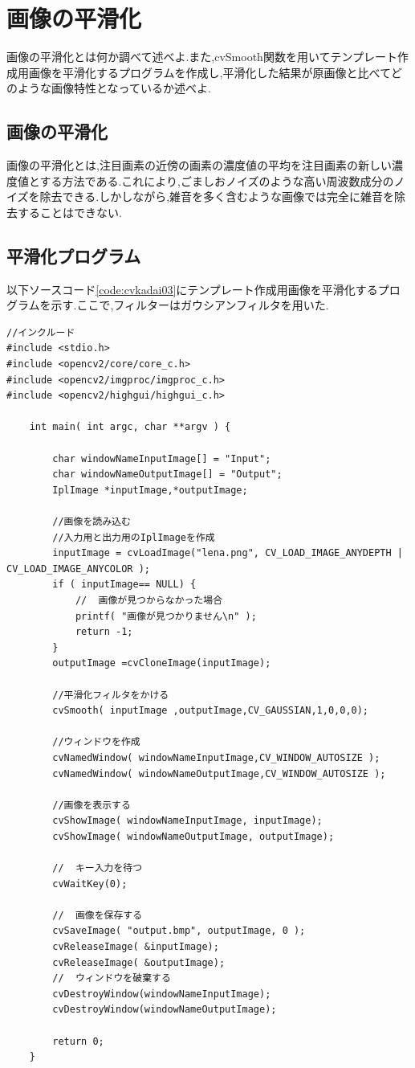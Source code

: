 \documentclass{jarticle}
\begin{document}
\section{画像の平滑化}
画像の平滑化とは何か調べて述べよ.また,cvSmooth関数を用いてテンプレート作成用画像を平滑化するプログラムを作成し,平滑化した結果が原画像と比べてどのような画像特性となっているか述べよ.

\subsection{画像の平滑化}
画像の平滑化とは,注目画素の近傍の画素の濃度値の平均を注目画素の新しい濃度値とする方法である.これにより,ごましおノイズのような高い周波数成分のノイズを除去できる.しかしながら,雑音を多く含むような画像では完全に雑音を除去することはできない.
\subsection{平滑化プログラム}
以下ソースコード\ref{code:cvkadai03}にテンプレート作成用画像を平滑化するプログラムを示す.ここで,フィルターはガウシアンフィルタを用いた.
\begin{lstlisting}[caption = 動画に対するテンプレートマッチング,label=code:cvkadai03]
	//インクルード
#include <stdio.h>
#include <opencv2/core/core_c.h>
#include <opencv2/imgproc/imgproc_c.h>
#include <opencv2/highgui/highgui_c.h>

	int main( int argc, char **argv ) {

		char windowNameInputImage[] = "Input";
		char windowNameOutputImage[] = "Output";
		IplImage *inputImage,*outputImage;

		//画像を読み込む
		//入力用と出力用のIplImageを作成
		inputImage = cvLoadImage("lena.png", CV_LOAD_IMAGE_ANYDEPTH | CV_LOAD_IMAGE_ANYCOLOR );
		if ( inputImage== NULL) {
			//	画像が見つからなかった場合
			printf( "画像が見つかりません\n" );
			return -1;
		}
		outputImage =cvCloneImage(inputImage);

		//平滑化フィルタをかける 
		cvSmooth( inputImage ,outputImage,CV_GAUSSIAN,1,0,0,0);

		//ウィンドウを作成
		cvNamedWindow( windowNameInputImage,CV_WINDOW_AUTOSIZE );
		cvNamedWindow( windowNameOutputImage,CV_WINDOW_AUTOSIZE );

		//画像を表示する
		cvShowImage( windowNameInputImage, inputImage);
		cvShowImage( windowNameOutputImage, outputImage);

		//	キー入力を待つ
		cvWaitKey(0);

		//	画像を保存する
		cvSaveImage( "output.bmp", outputImage, 0 );
		cvReleaseImage( &inputImage);
		cvReleaseImage( &outputImage);
		//	ウィンドウを破棄する
		cvDestroyWindow(windowNameInputImage);
		cvDestroyWindow(windowNameOutputImage);

		return 0;
	}
\end{lstlisting}
\end{document}
